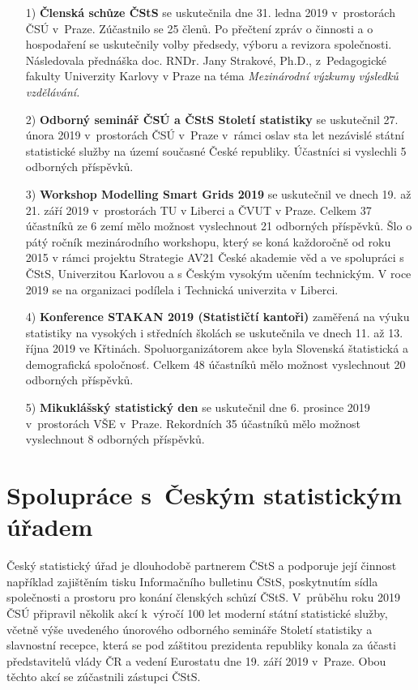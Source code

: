 \begin{itemize}
\itemsep=0pt
\item[1)] \textbf{Členská schůze ČStS} se uskutečnila dne 31. ledna 2019 v prostorách ČSÚ v Praze. Zúčastnilo se 25 členů. Po přečtení zpráv o činnosti a o hospodaření se uskutečnily volby předsedy, výboru a revizora společnosti. Následovala přednáška doc. RNDr. Jany Strakové, Ph.D., z Pedagogické fakulty Univerzity Karlovy v Praze na téma \textit{Mezinárodní výzkumy výsledků vzdělávání.} 
\item[2)] \textbf{Odborný seminář ČSÚ a ČStS Století statistiky} se uskutečnil 27. února 2019 v prostorách ČSÚ v Praze v rámci oslav sta let nezávislé státní statistické služby na území současné České republiky. Účastníci si vyslechli 5 odborných příspěvků.
\item[3)] \textbf{Workshop Modelling Smart Grids 2019} se uskutečnil ve dnech 19. až 21. září 2019 v prostorách TU v Liberci a ČVUT v Praze. Celkem 37 účastníků ze 6 zemí mělo možnost vyslechnout 21 odborných příspěvků. Šlo o pátý ročník mezinárodního workshopu, který se koná každoročně od roku 2015 v rámci projektu Strategie AV21 České akademie věd a ve spolupráci s ČStS, Univerzitou Karlovou a s Českým vysokým učením technickým. V roce 2019 se na organizaci podílela i Technická univerzita v Liberci. 
\item[ 4)] \textbf{Konference STAKAN 2019 (Statističtí kantoři)} zaměřená na výuku statistiky na vysokých i středních školách se uskutečnila ve dnech 11. až 13. října 2019 ve Křtinách. Spoluorganizátorem akce byla Slovenská štatistická a demografická spoločnosť. Celkem 48 účastníků mělo možnost vyslechnout 20 odborných příspěvků.
\item[    5)] \textbf{Mikuklášský statistický den} se uskutečnil dne 6. prosince 2019 v prostorách VŠE v Praze. Rekordních 35 účastníků mělo možnost vyslechnout 8 odborných příspěvků.   
    \end{itemize}
    
\section*{Spolupráce s Českým statistickým úřadem}
Český statistický úřad je dlouhodobě partnerem ČStS a podporuje její činnost například zajištěním tisku Informačního bulletinu ČStS, poskytnutím sídla společnosti a prostoru pro konání členských schůzí ČStS. V průběhu roku 2019 ČSÚ připravil několik akcí k výročí 100 let moderní státní statistické služby, včetně výše uvedeného únorového odborného semináře Století statistiky a slavnostní recepce, která se pod záštitou prezidenta republiky konala za účasti představitelů vlády ČR a vedení Eurostatu dne 19. září 2019 v Praze. Obou těchto akcí se zúčastnili zástupci ČStS. 

